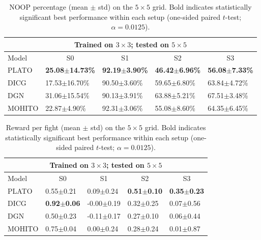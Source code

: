 \begin{table}[t]
\centering
\small
\setlength{\tabcolsep}{2.5pt}
\renewcommand{\arraystretch}{1.03}
\begin{tabular}{l|l|l|l|l}
\toprule
\multicolumn{5}{c}{Trained on $3\times 3$; tested on $5\times 5$} \\
\midrule
Model & \multicolumn{1}{c|}{S0} & \multicolumn{1}{c|}{S1} & \multicolumn{1}{c|}{S2} & \multicolumn{1}{c}{S3} \\
\midrule
PLATO & \textbf{25.08$\pm$14.73\%} & \textbf{92.19$\pm$3.90\%} & \textbf{46.42$\pm$6.96\%} & \textbf{56.08$\pm$7.33\%} \\
DICG & 17.53$\pm$16.70\% & 90.50$\pm$3.60\% & 59.65$\pm$6.80\% & 63.84$\pm$4.72\% \\
DGN & 31.06$\pm$15.54\% & 90.13$\pm$3.91\% & 63.88$\pm$5.21\% & 67.51$\pm$3.48\% \\
MOHITO  & 22.87$\pm$4.90\% & 92.31$\pm$3.06\% & 55.08$\pm$8.60\% & 64.35$\pm$6.45\% \\
\bottomrule
\end{tabular}
\caption{NOOP percentage (mean $\pm$ std) on the $5\times 5$ grid. Bold indicates statistically significant best performance within each setup (one-sided paired $t$-test; $\alpha=0.0125$).}
\label{tab:zs_noop_5x5_from_3x3}
\end{table}




\begin{table}[t]
\centering
\small
\setlength{\tabcolsep}{2.5pt}
\renewcommand{\arraystretch}{1.03}
\begin{tabular}{l|l|l|l|l}
\toprule
\multicolumn{5}{c}{Trained on $3\times 3$; tested on $5\times 5$} \\
\midrule
Model & \multicolumn{1}{c|}{S0} & \multicolumn{1}{c|}{S1} & \multicolumn{1}{c|}{S2} & \multicolumn{1}{c}{S3} \\
\midrule
PLATO & 0.55$\pm$0.21 & 0.09$\pm$0.24 & \textbf{0.51$\pm$0.10} & \textbf{0.35$\pm$0.23} \\
DICG & \textbf{0.92$\pm$0.06} & -0.00$\pm$0.19 & 0.32$\pm$0.25 & 0.07$\pm$0.56 \\
DGN & 0.50$\pm$0.23 & -0.11$\pm$0.17 & 0.27$\pm$0.10 & 0.06$\pm$0.44 \\
MOHITO  & 0.75$\pm$0.04 & 0.00$\pm$0.24 & 0.28$\pm$0.24 & 0.01$\pm$0.87 \\
\bottomrule
\end{tabular}
\caption{Reward per fight (mean $\pm$ std) on the $5\times 5$ grid. Bold indicates statistically significant best performance within each setup (one-sided paired $t$-test; $\alpha=0.0125$).}
\label{tab:zs_rpf_5x5_from_3x3}
\end{table}






